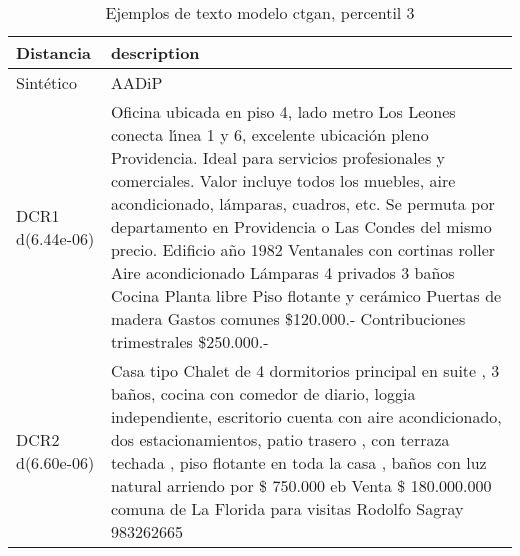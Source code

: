 \begin{table}[H]
\centering
\fontsize{10}{14}\selectfont
\caption{Ejemplos de texto modelo ctgan, percentil 3}
\label{table-example-economicos-a-3-ctgan-3p-text}
\begin{tabular}{|l|m{35em}|}
\hline
\rowcolor[gray]{0.8}
Distancia & description \\
\hline Sintético & AADiP \\
\hline DCR1 d(6.44e-06) & Oficina ubicada en piso 4, lado metro Los Leones conecta l{\'\i}nea 1 y 6, excelente ubicaci\'on pleno Providencia. Ideal para servicios profesionales y comerciales. Valor incluye todos los muebles, aire acondicionado, l\'amparas, cuadros, etc.  Se permuta por departamento en Providencia o Las Condes del mismo precio.  Edificio a\~no 1982 Ventanales con cortinas roller Aire acondicionado L\'amparas 4 privados 3 ba\~nos Cocina Planta libre Piso flotante y cer\'amico Puertas de madera Gastos comunes \$120.000.- Contribuciones trimestrales \$250.000.- \\
\hline DCR2 d(6.60e-06) & Casa tipo Chalet de 4 dormitorios principal en suite , 3 ba\~nos, cocina con comedor de diario, loggia independiente, escritorio cuenta con aire acondicionado, dos estacionamientos, patio trasero , con terraza techada , piso flotante en toda la casa , ba\~nos con luz natural arriendo por \$ 750.000 eb Venta \$ 180.000.000 comuna de La Florida para visitas Rodolfo Sagray 983262665 \\
\hline
\end{tabular}
\end{table}
